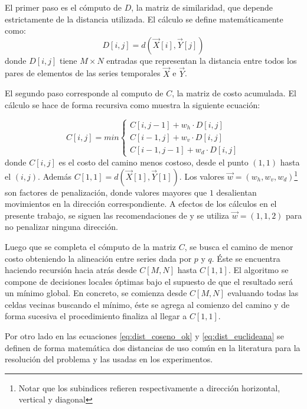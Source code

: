 \documentclass
  [ams,pdfout]%
	{aeslac}
\begin{document}
El primer paso es el cómputo de $D$, la matriz de similaridad, que depende estrictamente de la distancia utilizada. El cálculo se define matemáticamente como:
\begin{equation}
\label{eq:matrizsimilaridad}
D[i,j] = d(\vec{X}[i],\vec{Y}[j])
\end{equation}
donde $D[i,j]$ tiene $M\times N$ entradas que representan la distancia entre todos los pares de elementos de las series temporales $\vec{X}$ e $\vec{Y}$.  


El segundo paso corresponde al computo de $C$, la matriz de costo acumulada. El cálculo se hace de forma recursiva como muestra la siguiente ecuación: 

\begin{equation}
\label{eq:matrizcosto}
C[i,j] = min\left\lbrace  
\begin{array}{ll}
C[i,j-1] + w_h\cdot D[i,j]\\
C[i-1,j] + w_v\cdot D[i,j]\\
C[i-1,j-1] + w_d\cdot D[i,j]
\end{array}
\right.
\end{equation}
donde $C[i,j]$ es el costo del camino menos costoso, desde el punto $(1,1)$ hasta el $(i,j)$. Además $C[1,1]=d(\vec{X}[1],\vec{Y}[1])$. Los valores $\vec{w}=(w_h,w_v,w_d)$\footnote{Notar que los subindices refieren respectivamente a dirección horizontal, vertical y diagonal} son factores de penalización, donde valores mayores que $1$ desalientan movimientos en la dirección correspondiente. A efectos de los cálculos en el presente trabajo, se siguen las recomendaciones de \cite{sakoe1978dynamic} y se utiliza $\vec{w}=(1,1,2)$ para no penalizar ninguna dirección. 

Luego que se completa el cómputo de la matriz $C$, se busca el camino de menor costo obteniendo la alineación entre series dada por $p$ y $q$. Éste se encuentra haciendo recursión hacia atrás desde $C[M,N]$ hasta $C[1,1]$. El algoritmo se compone de decisiones locales óptimas bajo el supuesto de que el resultado será un mínimo global. En concreto, se comienza desde $C[M,N]$ evaluando todas las celdas vecinas buscando el mínimo, éste se agrega al comienzo del camino y de forma sucesiva el procedimiento finaliza al llegar a $C[1,1]$.


Por otro lado en las ecuaciones \ref{eq:dist_coseno_ok} y \ref{eq:dist_euclideana} se definen de forma matemática dos distancias de uso común en la literatura para la resolución del problema y las usadas en los experimentos.
\end{document}
